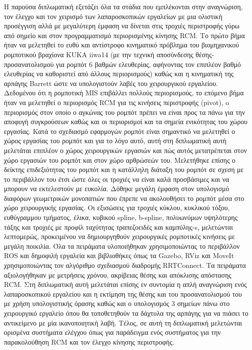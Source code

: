 Η παρούσα διπλωματική εξετάζει όλα τα στάδια που εμπλέκονται στην αναγνώριση, τον έλεγχο και τον χειρισμό των λαπαροσκοπικών εργαλείων με μια ολιστική προσέγγιση αλλά με μεγαλύτερη έμφαση να δίνεται στις τροχιές περιστροφής 
γύρω από σημείο και στον προγραμματισμό περιορισμένης κίνησης RCM. Το πρώτο βήμα ήταν να μελετηθεί το ευθύ και αντίστροφο κινηματικό πρόβλημα του βιομηχανικού ρομποτικού βραχίονα KUKA iiwa14 (με την τεχνική αποσύνδεσης θέσης-
προσανατολισμού για ρομπότ 6 βαθμών ελευθερίας, αφήνοντας τον επιπλέον βαθμό ελευθερίας να καθοριστεί από άλλους περιορισμούς) καθώς και η κινηματική της αρπάγης Barrett ώστε να υπολογιστούν λαβές του χειρουργικού εργαλείου. 
Δεδομένου ότι η ρομποτική MIS επιβάλλει πολλούς περιορισμούς, το επόμενο βήμα ήταν να μελετηθεί ο περιορισμός RCM για τις κινήσεις περιστροφής (pivot), o περιορισμός στον οποίο ο αγκώνας του ρομπότ πρέπει να είναι προς τα πάνω 
για την αποφυγή συγκρούσεων καθώς και οι περιορισμοί και τα σημεία ενικότητας του χώρου εργασίας. Κατά το σχεδιασμό εφαρμογών ρομπότ είναι σημαντικό να μελετηθεί ο χώρος εργασίας του ρομπότ και για το λόγο αυτό, αυτή στη 
διπλωματική αυτή μελετάται επιπλέον ο χώρος χειρουργικών εργασιών και πώς αυτός μετατρέπεται στον χώρο εργασιών του ρομπότ και στον χώρο αρθρώσεών του. Μελετήθηκε επίσης ο δείκτης επιδεξιότητας του ρομπότ και η κατάλληλη 
διάταξη του ρομπότ σε σχεση με το περιβάλλον του έτσι ώστε όλες οι τροχιές να είναι καλά προσβάσιμες και να μπορουν να εκτελεστούν με ευκολία. Δόθηκε μεγάλη έμφαση στον υπολογισμό διαφόρων γεωμετρικών μονοπατιών που έπρεπε να 
ακολουθήσει το ρομπότ μέσα στο χώρο χειρουργικής εργασίας. Οι εξισώσεις για τροχιές κύκλου, κυκλικού τόξου, ευθύγραμμου τμήματος, έλικα, κυβικού spline, b-spline, πολυωνύμων υψηλότερης τάξης και τροχιές με προφίλ ταχύτητας 
τραπεζοειδές και καμπύλης-s, μελετώνται λεπτομερώς, προκειμένου να δημιουργηθούν χειρουργικές ρομποτικές κινήσεις με μεγάλη ποικιλία. Όλα τα πειράματα υλοποιήθηκαν χρησιμοποιώντας το περιβάλλον ROS και δημοφιλή εργαλεία και 
βιβλιοθήκες όπως τα Gazebo, RViz και MoveIt χρησιμοποιώντας τον αλγόριθμο σχεδιασμού διαδρομής RRTConnect. Τα πειράματα αξιολογήθηκαν με μετρήσεις χρόνου, ακρίβειας θέσης και απόκλισης απόστασης RCM. Στη διπλωματική αυτή 
μελετάται επίσης εν συντομία η απλή αναγνώριση ενός λαπαροσκοπικού εργαλείου και η εκτίμηση της θέσης και του προσανατολισμού του με χρήση υπολογιστικής όρασης καθώς και ο υπολογισμός 3 σημείων πάνω στο χειρουργικό εργαλείο 
όπου θα τοποθετηθούν τα δάχτυλα της αρπάγης για να πιάσει το αντικείμενο με μία ικανοποιητική λαβή. Τέλος, σε αυτή τη διπλωματική μελετώνται ορισμένα συστήματα ελέγχου όπως για παράδειγμα ενός συστήματος για την παρακολούθηση 
RCM και τον έλεγχο κίνησης περιστροφής.
